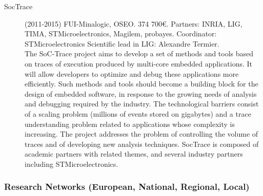 \begin{description}
\item[ SocTrace] (2011-2015)  FUI-Minalogic, OSEO. 374 700\euro. Partners: INRIA, LIG, TIMA, STMicroelectronics, Magilem, probayes. Coordinator: STMicroelectronics
Scientific lead in LIG: Alexandre Termier.  \\
The SoC-Trace project aims to develop a set of methods and tools based on traces of execution produced by multi-core embedded applications. It will allow developers to optimize and debug these applications more efficiently. Such methods and tools should become a building block for the design of embedded software, in response to the growing needs of analysis and debugging required by the industry. The technological barriers consist of a scaling problem (millions of events stored on gigabytes) and a trace understanding problem related to applications whose complexity is increasing. The project addresses the problem of controlling the volume of traces and of developing new analysis techniques. SocTrace is composed of academic partners with related themes, and several industry partners including STMicroelectronics.

\end{description}

\subsubsection{Research Networks (European, National, Regional, Local)}

